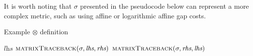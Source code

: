 \documentclass[11pt]{article}
\begin{document}
It is worth noting that $\sigma$ presented in the pseudocode below can represent a more complex metric, such as using affine or logarithmic affine gap costs.

\begin{algorithm}
  \caption{Example $\otimes$ definition}\label{pairwiseAlignment}
  \begin{algorithmic}[1]
    \Ensure{$\Sigma_{\Gamma}^{*}$}
      \newline
        \State \Return $\textit{lhs}$
        \State \Return $\Call{matrixTraceback}{\sigma, \textit{lhs}, \textit{rhs}}$
      \Else
        \State \Return $\Call{matrixTraceback}{\sigma, \textit{rhs}, \textit{lhs}}$
      \EndIf
    \EndFunction
  \end{algorithmic}
\end{algorithm}
\end{document}
